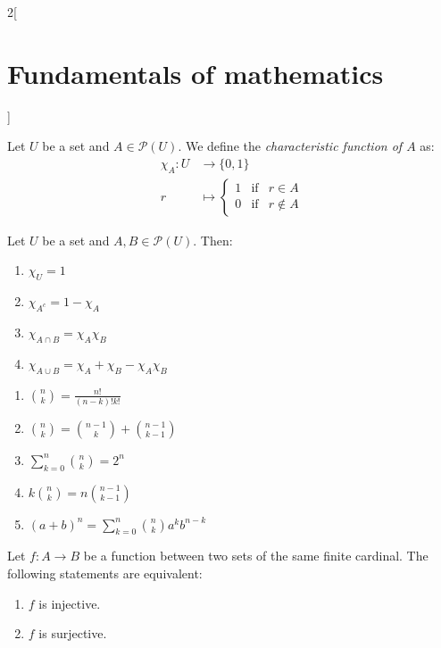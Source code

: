 \documentclass[../../../main.tex]{subfiles}
\begin{document}
\begin{multicols}{2}[\section{Fundamentals of mathematics}]
\begin{prop}
    \end{prop}
    \begin{definition}
        Let $U$ be a set and $A\in\mathcal{P}(U)$. We define the \textit{characteristic function of $A$} as: 
        \begin{align*}
            \chi_A:U&\longrightarrow\{0,1\}\\
            r&\longmapsto \left\{
            \begin{array}{rcl}
            1 & \text{if} & r\in A \\
            0 & \text{if} & r\notin A
            \end{array}\right.
        \end{align*}
    \end{definition}
    \begin{prop}
        Let $U$ be a set and $A,B\in\mathcal{P}(U)$. Then:
        \begin{enumerate}
            \item $\chi_U=1$
            \item $\chi_{A^c}=1-\chi_A$
            \item $\chi_{A\cap B}=\chi_A\chi_B$
            \item $\chi_{A\cup B}=\chi_A+\chi_B-\chi_A\chi_B$
        \end{enumerate}
    \end{prop}
    \begin{prop}\hfill
        \begin{enumerate}
            \item $\binom{n}{k}=\frac{n!}{(n-k)!k!}$
            \item $\binom{n}{k}=\binom{n-1}{k}+\binom{n-1}{k-1}$
            \item $\sum_{k=0}^n\binom{n}{k}=2^n$
            \item $k\binom{n}{k}=n\binom{n-1}{k-1}$
            \item $(a+b)^n=\sum_{k=0}^n\binom{n}{k}a^kb^{n-k}$
        \end{enumerate}
    \end{prop}
    \begin{prop}
        Let $f:A\rightarrow B$ be a function between two sets of the same finite cardinal. The following statements are equivalent:
        \begin{enumerate}
            \item $f$ is injective.
            \item $f$ is surjective.

\end{enumerate}
\end{prop}
\end{multicols}
\end{document}
